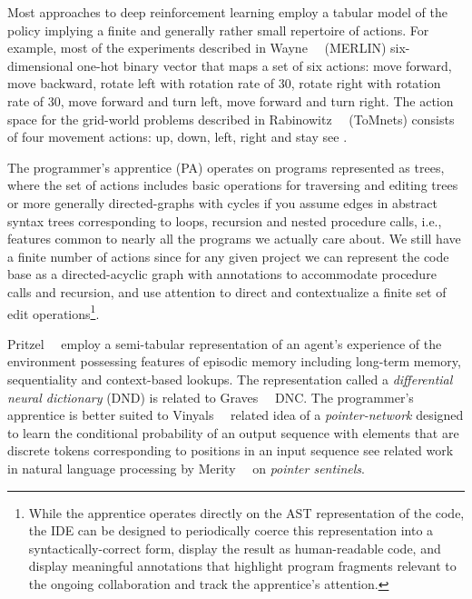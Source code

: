 Most approaches to deep reinforcement learning employ a tabular model of the policy implying a finite \emdash{} and generally rather small \emdash{} repertoire of actions. For example, most of the experiments described in Wayne~\etal{}~\cite{WayneetalCoRR-18} (MERLIN) six-dimensional one-hot binary vector that maps a set of six actions: move forward, move backward, rotate left with rotation rate of 30, rotate right with rotation rate of 30, move forward and turn left, move forward and turn right. The action space for the grid-world problems described in Rabinowitz~\etal{}~\cite{RabinowitzetalCoRR-18} (ToMnets) consists of four movement actions: up, down, left, right and stay \emdash{} see {{}}.

The programmer's apprentice (PA) operates on programs represented as trees, where the set of actions includes basic operations for traversing and editing trees \emdash{} or more generally directed-graphs with cycles if you assume edges in abstract syntax trees corresponding to loops, recursion and nested procedure calls, i.e., features common to nearly all the programs we actually care about. We still have a finite number of actions since for any given project we can represent the code base as a directed-acyclic graph with annotations to accommodate procedure calls and recursion, and use attention to direct and contextualize a finite set of edit operations\footnote{%
%
  While the apprentice operates directly on the AST representation of the code, the IDE can be designed to periodically coerce this representation into a syntactically-correct form, display the result as human-readable code, and display meaningful annotations that highlight program fragments relevant to the ongoing collaboration and track the apprentice's attention.}.

Pritzel~\etal{}~\cite{PritzeletalCoRR-17} employ a semi-tabular representation of an agent's experience of the environment possessing features of episodic memory including long-term memory, sequentiality and context-based lookups. The representation called a {\it{differential neural dictionary}} (DND) is related to Graves~\etal{}~\cite{GravesetalNATURE-16} DNC. The programmer's apprentice is better suited to Vinyals~\etal{}~\cite{VinyalsetalNIPS-15} related idea of a {\it{pointer-network}} designed to learn the conditional probability of an output sequence with elements that are discrete tokens corresponding to positions in an input sequence \emdash{} see related work in natural language processing by Merity~\etal{}~\cite{MerityetalCoRR-16} on {\it{pointer sentinels}}.

